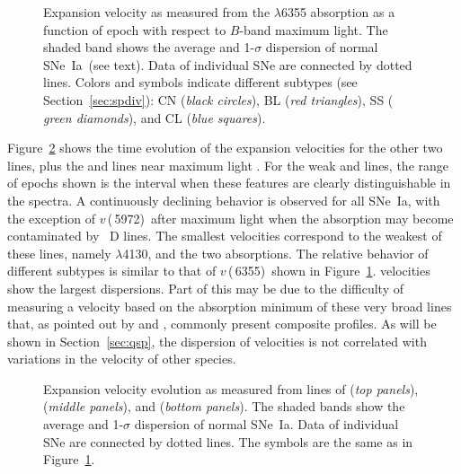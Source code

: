 \documentclass[apj]{emulateapj-rtx4}
\newcommand{\vfive}{$v$\,(\ion{Si}{2}\,5972)}
\newcommand{\vsix}{$v$\,(\ion{Si}{2}\,6355)}
\newcommand{\sneia}{SNe~Ia}
\begin{document}
\begin{figure}[htpb]%
\caption{Expansion velocity as measured from the  $\lambda$6355
  absorption as a function of epoch with respect to $B$-band maximum
  light. The shaded band shows the average and 1-$\sigma$ 
  dispersion of normal \sneia\ (see text). Data of individual SNe are
  connected by dotted lines. Colors and symbols indicate different subtypes (see
  Section~\ref{sec:spdiv}): CN ({\em black circles}), BL ({\em red triangles}), SS ({\em
    green diamonds}), and CL ({\em blue squares}).\label{fig:vel6}}
\end{figure}

Figure~\ref{fig:vel251347} shows the time evolution of the expansion
velocities for the other two  lines, plus the 
and  lines near maximum light \citep[cf. Figure~4
  of][]{silverman12b}. For the weak  and 
 lines, the range of epochs shown is the interval when these
features are clearly distinguishable in the spectra. A continuously
declining behavior is observed for all \sneia, with the exception of \vfive\ after maximum
light when the absorption may become contaminated by ~D lines. The
smallest velocities correspond to the weakest of these lines, namely
 $\lambda$4130, and the two  absorptions. The relative
behavior of different subtypes is similar to that of \vsix\ shown in
Figure~\ref{fig:vel6}.   velocities show the largest
dispersions. Part of this may be due to the difficulty of measuring a
velocity based on the absorption minimum of these very broad lines that, as
pointed out by \citet{foley11b} and \citet{blondin12}, commonly
present composite profiles. As will be shown in Section~\ref{sec:qsp},
the dispersion of  velocities is not correlated with
variations in the velocity of other species.

\begin{figure}[htpb]%
\caption{Expansion velocity evolution as measured from lines of
   ({\em top panels}),  ({\em middle panels}),
  and  ({\em bottom panels}). The shaded bands show the
  average and 1-$\sigma$ dispersion of normal \sneia. Data of individual
  SNe are connected by dotted lines. The symbols are the same as in
  Figure~\ref{fig:vel6}.\label{fig:vel251347}} 
\end{figure}
\end{document}
